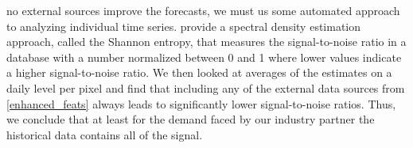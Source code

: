     no external sources improve the forecasts, we must us some automated
    approach to analyzing individual time series.
\cite{barbour2014} provide a spectral density estimation approach, called
    the Shannon entropy, that measures the signal-to-noise ratio in a
    database with a number normalized between 0 and 1 where lower values
    indicate a higher signal-to-noise ratio.
We then looked at averages of the estimates on a daily level per pixel and
    find that including any of the external data sources from
    \ref{enhanced_feats} always leads to significantly lower signal-to-noise
    ratios.
Thus, we conclude that at least for the demand faced by our industry partner
    the historical data contains all of the signal.
